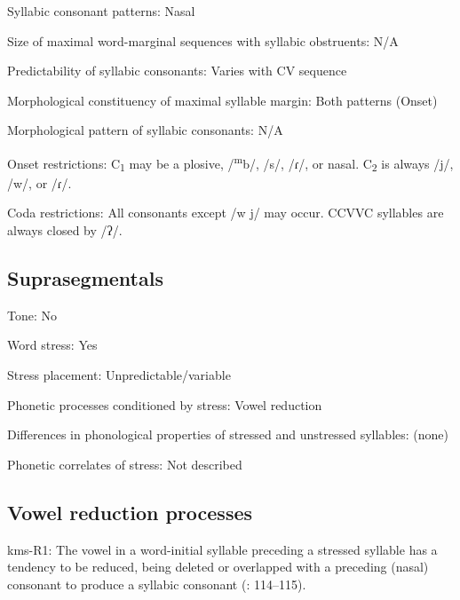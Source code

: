 {\begin{appendixdesc}
\item[Syllabic consonant patterns:] Nasal

\item[Size of maximal word-marginal sequences with syllabic obstruents:] N/A

\item[Predictability of syllabic consonants:] Varies with CV sequence

\item[Morphological constituency of maximal syllable margin:] Both patterns (Onset)

\item[Morphological pattern of syllabic consonants:] N/A

\item[Onset restrictions:] C\textsubscript{1} may be a plosive, /\textsuperscript{m}b/, /s/, /ɾ/, or nasal. C\textsubscript{2} is always /j/, /w/, or /ɾ/.

\item[Coda restrictions:] All consonants except /w j/ may occur. CCVVC syllables are always closed by /ʔ/.
\end{appendixdesc}
\subsection*{Suprasegmentals}
\begin{appendixdesc}
\item[Tone:] No

\item[Word stress:] Yes

\item[Stress placement:] Unpredictable/variable

\item[Phonetic processes conditioned by stress:] Vowel reduction

\item[Differences in phonological properties of stressed and unstressed syllables:] (none)

\item[Phonetic correlates of stress:] Not described
\end{appendixdesc}
\subsection*{Vowel reduction processes}
\begin{appendixdesc}

\item[kms-R1:] The vowel in a word-initial syllable preceding a stressed syllable has a tendency to be reduced, being deleted or overlapped with a preceding (nasal) consonant to produce a syllabic consonant (\citealt{SandersSanders1980}: 114--115).


\end{appendixdesc}}

